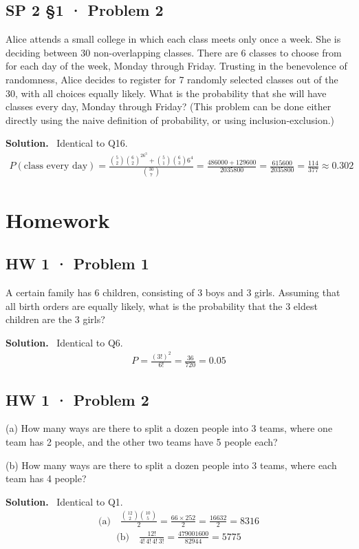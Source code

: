 \documentclass[11pt]{article}
\newcommand{\Sol}{\vspace{2pt}\noindent\textbf{Solution.}\ }
\begin{document}
\subsection{SP 2 §1 · Problem 2}
\begin{qbox}
Alice attends a small college in which each class meets only once a week. She is deciding between 30 non-overlapping classes. There are 6 classes to choose from for each day of the week, Monday through Friday. Trusting in the benevolence of randomness, Alice decides to register for 7 randomly selected classes out of the 30, with all choices equally likely. What is the probability that she will have classes every day, Monday through Friday? (This problem can be done either directly using the naive definition of probability, or using inclusion-exclusion.)
\end{qbox}
\Sol
Identical to Q16.
\begin{align*}
P(\text{class every day}) = \frac{\binom{5}{2}\binom{6}{2}^26^3+\binom{5}{1}\binom{6}{3}6^4}{\binom{30}{7}} = \frac{486000+129600}{2035800} = \frac{615600}{2035800}=\frac{114}{377}\approx 0.302
\end{align*}

\newpage
\section*{Homework}

\subsection{HW 1 · Problem 1}
\begin{qbox}
A certain family has 6 children, consisting of 3 boys and 3 girls. Assuming that all birth orders are equally likely, what is the probability that the 3 eldest children are the 3 girls?
\end{qbox}
\Sol
Identical to Q6.
\begin{align*}
P = \frac{(3!)^2}{6!} = \frac{36}{720} = 0.05
\end{align*}

\subsection{HW 1 · Problem 2}
\begin{qbox}
(a) How many ways are there to split a dozen people into 3 teams, where one team has 2 people, and the other two teams have 5 people each?

(b) How many ways are there to split a dozen people into 3 teams, where each team has 4 people?
\end{qbox}
\Sol
Identical to Q1.
\begin{align*}
\text{(a)}\quad \frac{\binom{12}{2}\binom{10}{5}}{2} = \frac{66\times 252}{2} = \frac{16632}{2} = 8316
\end{align*}
\begin{align*}
\text{(b)}\quad \frac{12!}{4!\,4!\,4!\,3!} = \frac{479001600}{82944} = 5775
\end{align*}
\end{document}
